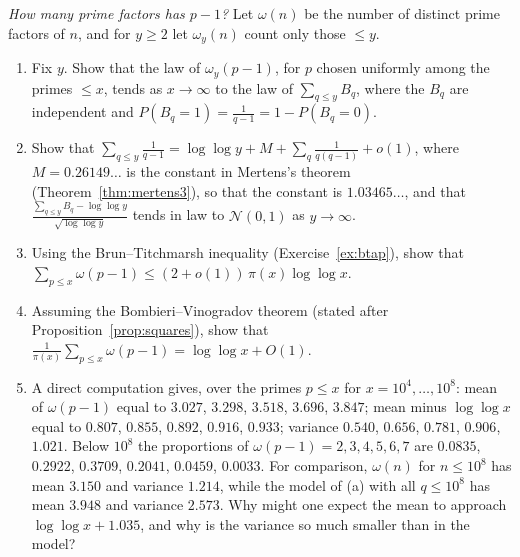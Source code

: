 \begin{exercise}[$\star\star\star$]\label{pb:shifted}
\emph{How many prime factors has $p-1$?} Let $\omega(n)$ be the number of distinct prime factors of $n$, and for $y\ge2$ let $\omega_y(n)$ count only those $\le y$.
\begin{enumerate}[label=(\alph*)]
\item Fix $y$. Show that the law of $\omega_y(p-1)$, for $p$ chosen uniformly among the primes $\le x$, tends as $x\to\infty$ to the law of $\sum_{q\le y}B_q$, where the
$B_q$ are independent and $P(B_q=1)=\frac1{q-1}=1-P(B_q=0)$.
\item Show that $\sum_{q\le y}\frac1{q-1}=\log\log y+M+\sum_q\frac1{q(q-1)}+o(1)$, where $M=0.26149\ldots$ is the constant in Mertens's theorem (Theorem~\ref{thm:mertens3}),
so that the constant is $1.03465\ldots$, and that $\frac{\sum_{q\le y}B_q-\log\log y}{\sqrt{\log\log y}}$ tends in law to $\mathcal N(0,1)$ as $y\to\infty$.
\item Using the Brun--Titchmarsh inequality (Exercise~\ref{ex:btap}), show that $\sum_{p\le x}\omega(p-1)\le(2+o(1))\,\pi(x)\log\log x$.
\item Assuming the Bombieri--Vinogradov theorem (stated after Proposition~\ref{prop:squares}), show that $\frac1{\pi(x)}\sum_{p\le x}\omega(p-1)=\log\log x+O(1)$.
\item A direct computation gives, over the primes $p\le x$ for $x=10^4,\dots,10^8$: mean of $\omega(p-1)$ equal to $3.027$, $3.298$, $3.518$, $3.696$, $3.847$; mean minus
$\log\log x$ equal to $0.807$, $0.855$, $0.892$, $0.916$, $0.933$; variance $0.540$, $0.656$, $0.781$, $0.906$, $1.021$. Below $10^8$ the proportions of
$\omega(p-1)=2,3,4,5,6,7$ are $0.0835$, $0.2922$, $0.3709$, $0.2041$, $0.0459$, $0.0033$. For comparison, $\omega(n)$ for $n\le10^8$ has mean $3.150$ and variance $1.214$,
while the model of (a) with all $q\le10^8$ has mean $3.948$ and variance $2.573$. Why might one expect the mean to approach $\log\log x+1.035$, and why is the variance
so much smaller than in the model?
\end{enumerate}
\end{exercise}

